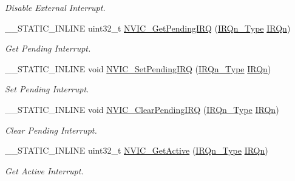 \begin{DoxyCompactItemize}
\begin{DoxyCompactList}\small\item\em Disable External Interrupt. \end{DoxyCompactList}\item 
\+\_\+\+\_\+\+S\+T\+A\+T\+I\+C\+\_\+\+I\+N\+L\+I\+NE uint32\+\_\+t \mbox{\hyperlink{group__CMSIS__Core__NVICFunctions_gafec8042db64c0f8ed432b6c8386a05d8}{N\+V\+I\+C\+\_\+\+Get\+Pending\+I\+RQ}} (\mbox{\hyperlink{group__SAME70J19__cmsis_gac3af4a32370fb28c4ade8bf2add80251}{I\+R\+Qn\+\_\+\+Type}} \mbox{\hyperlink{group__SAME70J19__cmsis_ga666eb0caeb12ec0e281415592ae89083}{I\+R\+Qn}})
\begin{DoxyCompactList}\small\item\em Get Pending Interrupt. \end{DoxyCompactList}\item 
\+\_\+\+\_\+\+S\+T\+A\+T\+I\+C\+\_\+\+I\+N\+L\+I\+NE void \mbox{\hyperlink{group__CMSIS__Core__NVICFunctions_ga3ecf446519da33e1690deffbf5be505f}{N\+V\+I\+C\+\_\+\+Set\+Pending\+I\+RQ}} (\mbox{\hyperlink{group__SAME70J19__cmsis_gac3af4a32370fb28c4ade8bf2add80251}{I\+R\+Qn\+\_\+\+Type}} \mbox{\hyperlink{group__SAME70J19__cmsis_ga666eb0caeb12ec0e281415592ae89083}{I\+R\+Qn}})
\begin{DoxyCompactList}\small\item\em Set Pending Interrupt. \end{DoxyCompactList}\item 
\+\_\+\+\_\+\+S\+T\+A\+T\+I\+C\+\_\+\+I\+N\+L\+I\+NE void \mbox{\hyperlink{group__CMSIS__Core__NVICFunctions_ga332e10ef9605dc6eb10b9e14511930f8}{N\+V\+I\+C\+\_\+\+Clear\+Pending\+I\+RQ}} (\mbox{\hyperlink{group__SAME70J19__cmsis_gac3af4a32370fb28c4ade8bf2add80251}{I\+R\+Qn\+\_\+\+Type}} \mbox{\hyperlink{group__SAME70J19__cmsis_ga666eb0caeb12ec0e281415592ae89083}{I\+R\+Qn}})
\begin{DoxyCompactList}\small\item\em Clear Pending Interrupt. \end{DoxyCompactList}\item 
\+\_\+\+\_\+\+S\+T\+A\+T\+I\+C\+\_\+\+I\+N\+L\+I\+NE uint32\+\_\+t \mbox{\hyperlink{group__CMSIS__Core__NVICFunctions_ga47a0f52794068d076c9147aa3cb8d8a6}{N\+V\+I\+C\+\_\+\+Get\+Active}} (\mbox{\hyperlink{group__SAME70J19__cmsis_gac3af4a32370fb28c4ade8bf2add80251}{I\+R\+Qn\+\_\+\+Type}} \mbox{\hyperlink{group__SAME70J19__cmsis_ga666eb0caeb12ec0e281415592ae89083}{I\+R\+Qn}})
\begin{DoxyCompactList}\small\item\em Get Active Interrupt. \end{DoxyCompactList}\item 

\end{DoxyCompactItemize}
